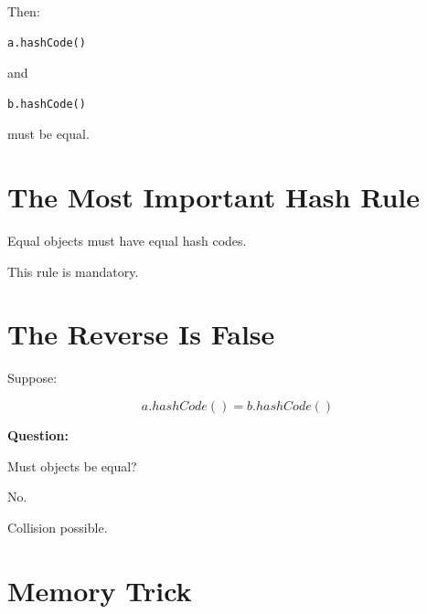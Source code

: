 \documentclass[11pt,a4paper]{book}
\begin{document}

Then:

\begin{verbatim} 
a.hashCode()
\end{verbatim}

and

\begin{verbatim} 
b.hashCode()
\end{verbatim}

must be equal.


\section{The Most Important Hash Rule}

\begin{rosettarule}

Equal objects must have
equal hash codes.

\end{rosettarule}


This rule is mandatory.


\section{The Reverse Is False}

Suppose:

\[
a.hashCode()
=
b.hashCode()
\]


\textbf{Question:}

Must objects be equal?


No.


Collision possible.


\section{Memory Trick}
\end{document}
